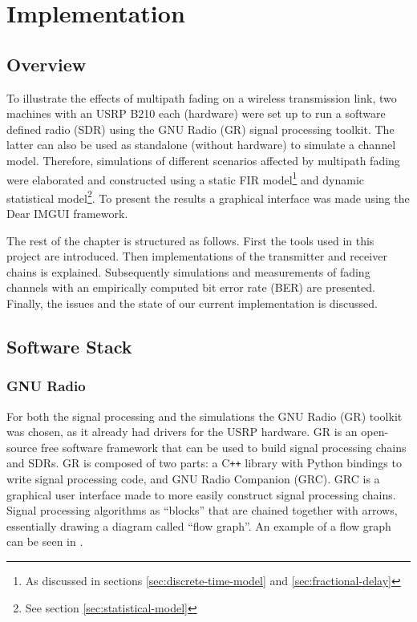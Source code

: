 
\chapter{Implementation} \label{chp:implementation}

\section{Overview}

To illustrate the effects of multipath fading on a wireless transmission link, two machines with an USRP B210 each (hardware) were set up to run a software defined radio (SDR) using the GNU Radio (GR) signal processing toolkit. The latter can also be used as standalone (without hardware) to simulate a channel model. Therefore, simulations of different scenarios affected by multipath fading were elaborated and constructed using a static FIR model\footnote{As discussed in sections \ref{sec:discrete-time-model} and \ref{sec:fractional-delay}} and dynamic statistical model\footnote{See section \ref{sec:statistical-model}}. To present the results a graphical interface was made using the Dear IMGUI framework.

The rest of the chapter is structured as follows. First the tools used in this project are introduced. Then implementations of the transmitter and receiver chains is explained. Subsequently simulations and measurements of fading channels with an empirically computed bit error rate (BER) are presented. Finally, the issues and the state of our current implementation is discussed.

\section{Software Stack}

\subsection{GNU Radio}

For both the signal processing and the simulations the GNU Radio (GR) toolkit was chosen, as it already had drivers for the USRP hardware. GR is an open-source free software framework that can be used to build signal processing chains and SDRs. GR is composed of two parts: a C\texttt{++} library with Python bindings to write signal processing code, and GNU Radio Companion (GRC). GRC is a graphical user interface made to more easily construct signal processing chains. Signal processing algorithms as ``blocks'' that are chained together with arrows, essentially drawing a diagram called ``flow graph''. An example of a flow graph can be seen in .

